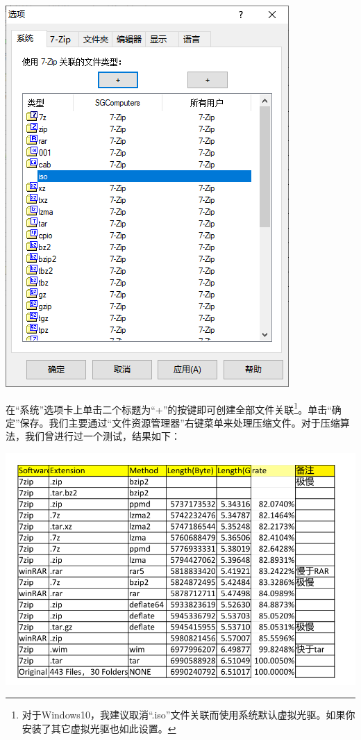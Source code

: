\documentclass{book}
\begin{document}
\begin{center}
	\includegraphics[scale=0.7]{pic/7zopt.PNG}
\end{center}
在“系统”选项卡上单击二个标题为“+”的按键即可创建全部文件关联\footnote{对于Windows10，我建议取消“.iso”文件关联而使用系统默认虚拟光驱。如果你安装了其它虚拟光驱也如此设置。}。单击“确定”保存。我们主要通过“文件资源管理器”右键菜单来处理压缩文件。对于压缩算法，我们曾进行过一个测试，结果如下：
\begin{center}
\includegraphics[scale=0.55]{pic/ziprate.PNG}	
\end{center}
\end{document}

